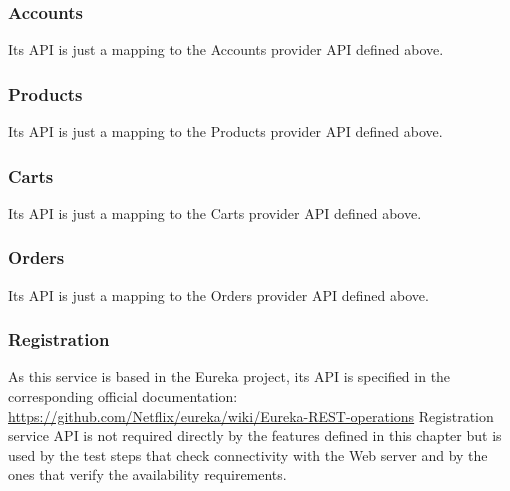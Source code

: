 \subsubsection{Accounts}
Its API is just a mapping to the Accounts provider API defined above.

\subsubsection{Products}
Its API is just a mapping to the Products provider API defined above.

\subsubsection{Carts}
Its API is just a mapping to the Carts provider API defined above.

\subsubsection{Orders}
Its API is just a mapping to the Orders provider API defined above.

\subsubsection{Registration}
As this service is based in the Eureka project, its API is specified in the corresponding official documentation: 
\hyperref[]{\textcolor[rgb]{0,0,1}{https://github.com/Netflix/eureka/wiki/Eureka-REST-operations}}
Registration service API is not required directly by the features defined in this chapter but is used by the test steps that check connectivity with the Web server and by the ones that verify the availability requirements.


